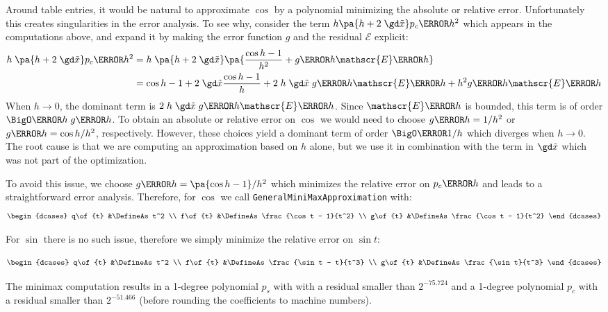 \documentclass[10pt, a4paper, twoside]{basestyle}
\newcommand{\red}[1]{\tilde{#1}}
\begin{document}
Around table entries, it would be natural to approximate $\cos$ by a polynomial minimizing the absolute or relative error.  Unfortunately this creates singularities in the error analysis.  To see why, consider the term $h \pa{h + 2 \; \gd \red x} p_c\of{h^2}$ which appears in the computations above, and expand it by making the error function $g$ and the residual $\mathscr{E}$ explicit:
\begin{align*}
h \; \pa{h + 2 \; \gd \red x} p_c\of{h^2} &= h \; \pa{h + 2 \; \gd \red x} \pa{\frac{\cos h - 1}{h^2} + g\of{h} \mathscr{E}\of{h}} \\
&= \cos h - 1 + 2 \; \gd \red x \frac{\cos h - 1}{h} + 2 \; h \; \gd \red x \; g\of{h} \mathscr{E}\of{h} + h^2 g\of{h} \mathscr{E}\of{h}
\end{align*}
When $h \to 0$, the dominant term is $2 \; h \; \gd \red x \; g\of{h} \mathscr{E}\of{h}$.  Since $\mathscr{E}\of{h}$ is bounded, this term is of order $\BigO\of{h \; g\of{h}}$.  To obtain an absolute or relative error on $\cos$ we would need to choose $g\of{h} = 1/h^2$ or $g\of{h} = \cos h/h^2$, respectively.  However, these choices yield a dominant term of order $\BigO\of{1/h}$ which diverges when $h \to 0$.  The root cause is that we are computing an approximation based on $h$ alone, but we use it in combination with the term in $\gd \red x$ which was not part of the optimization.

To avoid this issue, we choose $g\of{h} = \pa{\cos h - 1}/h^2$ which minimizes the relative error on $p_c\of{h}$ and leads to a straightforward error analysis.  Therefore, for $\cos$ we call \texttt{GeneralMiniMaxApproximation} with:
\[
\begin{dcases}
q\of{t} &\DefineAs t^2 \\
f\of{t} &\DefineAs \frac{\cos t - 1}{t^2} \\
g\of{t} &\DefineAs \frac{\cos t - 1}{t^2}
\end{dcases}
\]

For $\sin$ there is no such issue, therefore we simply minimize the relative error on $\sin t$:

\[
\begin{dcases}
q\of{t} &\DefineAs t^2 \\
f\of{t} &\DefineAs \frac{\sin t - t}{t^3} \\
g\of{t} &\DefineAs \frac{\sin t}{t^3}
\end{dcases}
\]

The minimax computation results in a 1-degree polynomial $p_s$ with with a residual smaller than $2^{-75.724}$ and a 1-degree polynomial $p_c$ with a residual smaller than $2^{-51.466}$ (before rounding the coefficients to machine numbers).
\end{document}
